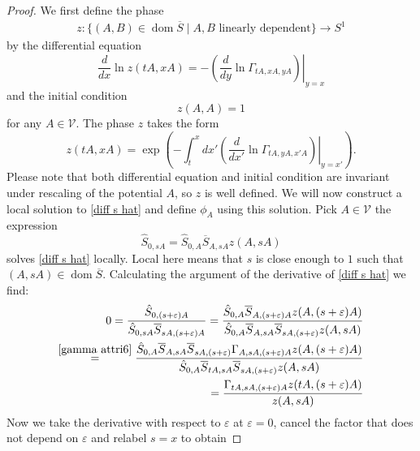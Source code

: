 \documentclass[b5paper,draft,openbib,12pt]{memoir}
\DeclareMathOperator{\dom}{dom}
\begin{document}
\begin{proof}
We first define the phase
\begin{align}\label{def local z}
z:\{(A,B)\in\dom\overline{S}\mid A, B \text{ linearly dependent}\} \rightarrow S^1
\end{align}
by the differential equation
\begin{equation}
\frac{d}{d x} \ln z(t A, x A) = - \left.\left( \frac{d}{dy} \ln \Gamma_{tA,x A, yA}\right)\right|_{y=x}
\end{equation}
and the initial condition 
\begin{equation}\label{z initial}
z(A,A)=1
\end{equation}
 for any \(A\in \mathcal{V}\). The phase \(z\) takes the form
\begin{equation}\label{z solution}
z(tA,xA)=\exp\left(-\int_{t}^x dx' \left.\left( \frac{d}{dx'} \ln \Gamma_{tA,y A, x' A}\right)\right|_{y=x'}\right).
\end{equation}
Please note that both differential equation and initial condition are invariant under rescaling of the potential \(A\), so \(z\) is well defined. 
We will now construct a local solution to \eqref{diff s hat} and define \(\phi_A\) using this solution.
Pick \(A\in \mathcal{V}\) the expression
\begin{equation}\label{loc s hat}
\hat{S}_{0,s A} = \hat{S}_{0, A} \overline{S}_{ A, s A} z( A, s A)
\end{equation}
solves \eqref{diff s hat} locally. Local here means that \(s\) is close enough to \(1\) such that \(( A, s A)\in\dom\overline{S}\).
Calculating the argument of the derivative of \eqref{diff s hat} we find:
\begin{align}
0= \frac{\hat{S}_{0,(s+\varepsilon) A}}{\hat{S}_{0,s A}\overline{S}_{s A, (s+\varepsilon)A}}
= \frac{\hat{S}_{0,A} \overline{S}_{A, (s+\varepsilon)A} z(A, (s+\varepsilon)A)}
{\hat{S}_{0, A} \overline{S}_{ A, s A} \overline{S}_{s A,(s+\varepsilon)}z( A, s A)}\\
\overset{\eqref{gamma attri6}}{=}
 \frac{\hat{S}_{0,A}\overline{S}_{ A, s A} \overline{S}_{s A,(s+\varepsilon)} \Gamma_{A, sA, (s+\varepsilon)A} z(A, (s+\varepsilon)A)}
{\hat{S}_{0, A} \overline{S}_{t A, s A} \overline{S}_{s A,(s+\varepsilon)}z( A, s A)}\\
= \frac{\Gamma_{tA,sA,(s+\varepsilon)A}z(tA, (s+\varepsilon)A)}{z( A, sA)}
\end{align}
Now we take the derivative with respect to \(\varepsilon\) at \(\varepsilon=0\), 
cancel the factor that does not depend on \(\varepsilon\) and relabel \(s=x\) to obtain

\end{proof}
\end{document}
